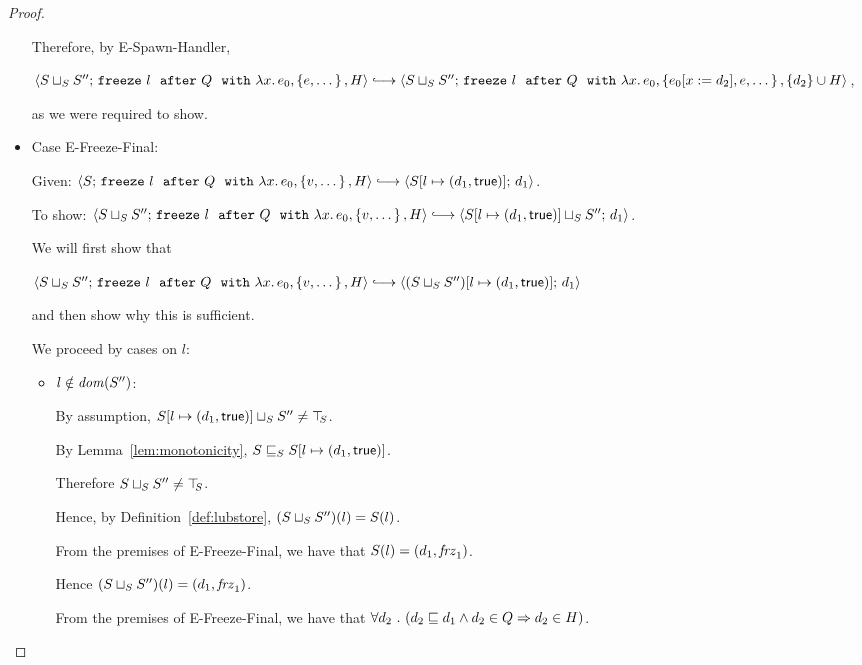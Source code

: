 \begin{proof}
\begin{itemize}
      Therefore, by {\sc E-Spawn-Handler},

      $\config{\lubstore{S}{S''}}{\freezeafterfull{l}{Q}{\lam{x}{e_0}}{\setof{e,
            \dots}}{H}} \parstepsto
      \config{\lubstore{S}{S''}}{\freezeafterfull{l}{Q}{\lam{x}{e_0}}{\setof{\subst{e_0}{x}{d_2},
            e, \dots}} {\{d_2\}\cup H}}$,

      as we were required to show.

    \item Case {\sc E-Freeze-Final}:


      Given:
      $\config{S}{\freezeafterfull{l}{Q}{\lam{x}{e_0}}{\setof{v,
            \dots}}{H}} \parstepsto
      \config{\extS{S}{l}{d_1}{\frozentrue}}{d_1}$.

      To show:
      $\config{\lubstore{S}{S''}}{\freezeafterfull{l}{Q}{\lam{x}{e_0}}{\setof{v,
            \dots}}{H}} \parstepsto
      \config{\lubstore{\extS{S}{l}{d_1}{\frozentrue}}{S''}}{d_1}$.

      We will first show that

      $\config{\lubstore{S}{S''}}{\freezeafterfull{l}{Q}{\lam{x}{e_0}}{\setof{v,
            \dots}}{H}} \parstepsto
      \config{\extS{(\lubstore{S}{S''})}{l}{d_1}{\frozentrue}}{d_1}$

      and then show why this is sufficient.

      We proceed by cases on $l$:
      \begin{itemize}
      \item $l \notin \mathit{dom}(S'')$:

        By assumption, $S[l \mapsto (d_1, \textsf{true})] \sqcup_{S} S''
        \neq \top\hspace{-0.85mm}_{S}$.

        By Lemma~\ref{lem:monotonicity},
        $S \sqsubseteq_S S[l \mapsto (d_1, \textsf{true})]$.

        Therefore $S \sqcup_{S} S'' \neq \top\hspace{-0.85mm}_{S}$.

        Hence, by Definition~\ref{def:lubstore},
        $(S \sqcup_{S} S'')(l) = S(l)$.

        From the premises of {\sc E-Freeze-Final}, we have that $S(l)
        = (d_1, \mathit{frz}_1)$.

        Hence $(S \sqcup_{S} S'')(l) = (d_1, \mathit{frz}_1)$.

        From the premises of {\sc E-Freeze-Final}, we have that
        $\forall{d_2} ~.~ ( {d_2 \sqsubseteq d_1 \land d_2 \in Q} \Rightarrow d_2 \in
        H)$.


\end{itemize}
\end{itemize}
\end{proof}
